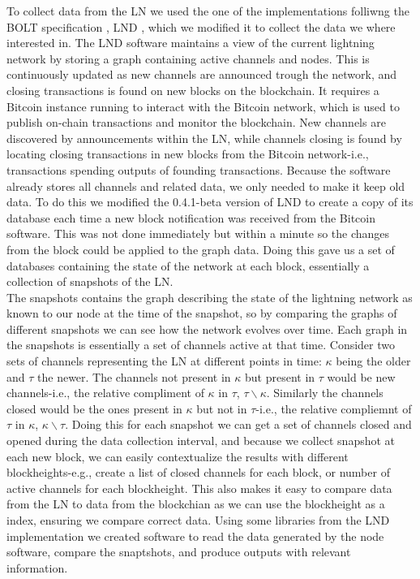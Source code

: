 To collect data from the LN we used the one of the implementations folliwng the BOLT specification \cite{bolt}, LND \cite{lnd}, which we modified it to collect the data we where interested in. The LND software maintains a view of the current lightning network by storing a graph containing active channels and nodes. This is continuously updated as new channels are announced trough the network, and closing transactions is found on new blocks on the blockchain. It requires a Bitcoin instance running to interact with the Bitcoin network, which is used to publish on-chain transactions and monitor the blockchain. New channels are discovered by announcements within the LN, while channels closing is found by locating closing transactions in new blocks from the Bitcoin network-i.e., transactions spending outputs of founding transactions. 
Because the software already stores all channels and related data, we only needed to make it keep old data.
To do this we modified the 0.4.1-beta version of LND to create a copy of its database each time a new block notification was received from the Bitcoin software. This was not done immediately but within a minute so the changes from the block could be applied to the graph data. Doing this gave us a set of databases containing the state of the network at each block, essentially a collection of snapshots of the LN.
\\

The snapshots contains the graph describing the state of the lightning network as known to our node at the time of the snapshot, so by comparing the graphs of different snapshots we can see how the network evolves over time. 
Each graph in the snapshots is essentially a set of channels active at that time. Consider two sets of channels representing the LN at different points in time: \(\kappa\) being the older and \(\tau\) the newer. The channels not present in \(\kappa\) but present in \(\tau\) would be new channels-i.e., the relative compliment of \(\kappa\) in \(\tau\), \( \tau \backslash{}\kappa\). Similarly the channels closed would be the ones present in \(\kappa\) but not in \(\tau\)-i.e., the relative compliemnt of \(\tau\) in \(\kappa\), \(\kappa\backslash{}\tau\). Doing this for each snapshot we can get a set of channels closed and opened during the data collection interval, and because we collect snapshot at each new block, we can easily contextualize the results with different blockheights-e.g., create a list of closed channels for each block, or number of active channels for each blockheight. This also makes it easy to compare data from the LN to data from the blockchian as we can use the blockheight as a index, ensuring we compare correct data.
Using some libraries from the LND implementation we created software to read the data generated by the node software, compare the snaptshots, and produce outputs with relevant information.
\\

